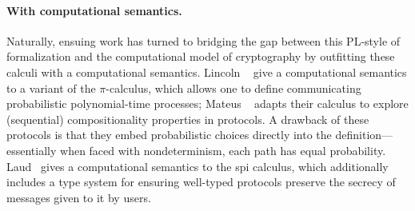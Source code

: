 \paragraph{With computational semantics.}
Naturally, ensuing work has turned to bridging the gap between this PL-style of
formalization and the computational model of cryptography by outfitting these
calculi with a computational semantics.
%
%
%
%
Lincoln \etal~\cite{lincoln1998probabilistic} give a computational semantics to
a variant of the $\pi$-calculus, which allows one to define communicating
probabilistic polynomial-time processes; Mateus
\etal~\cite{mateus2003composition} adapts their calculus to explore (sequential)
compositionality properties in protocols.
A drawback of these protocols is that they embed probabilistic choices directly
into the definition---essentially when faced with nondeterminism, each path
has equal probability.
Laud~\cite{laud2005secrecy} gives a
computational semantics to the spi calculus, which additionally includes a type
system for ensuring well-typed protocols preserve the secrecy of messages given
to it by users.

